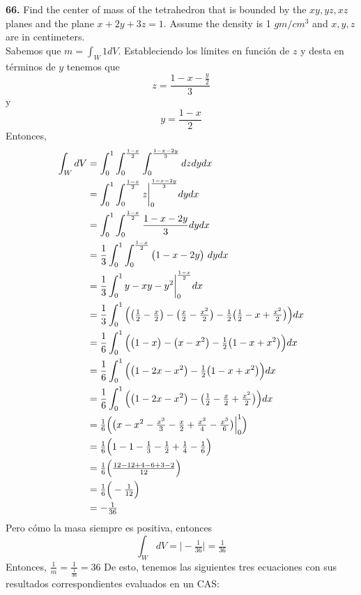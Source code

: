 \documentclass[11pt]{report}
\begin{document}
\textbf{66.} Find the center of mass of the tetrahedron that is bounded by the
$xy, yz, xz$ planes and the plane $x + 2y + 3z = 1$. Assume the density is
1 $gm/cm^3$ and $x, y, z$ are in centimeters. \\
Sabemos que $m = \int_W 1dV$. Estableciendo los límites en función de $z$ y desta en
términos de $y$
tenemos que
$$z=\frac{1-x-\tfrac{y}{2}}{3}$$ y
$$y=\frac{1-x}{2}$$
Entonces,
	\begin{align*}
		\int_WdV&=\int_0^1\tsint{\frac{1-x}{2}}\tsint{\frac{1-x-2y}{3}}dzdydx\\
			    &=\int_0^1\tsint{\frac{1-x}{2}}z\bigg|_0^{\frac{1-x-2y}{3}}dydx\\
				&=\int_0^1\tsint{\frac{1-x}{2}}\frac{1-x-2y}{3}dydx\\
				&=\frac{1}{3}\int_0^1\tsint{\frac{1-x}{2}}\bp{1-x-2y}\ dydx\\
				&=\frac{1}{3}\int_0^1y-xy-y^2\bigg|_0^{\frac{1-x}{2}}dx\\
				&=\frac{1}{3}\int_0^1\Bp{\bp{\tfrac{1}{2}-\tfrac{x}{2}}-\bp{\tfrac{x}{2}
					-\tfrac{x^2}{2}}-\tfrac{1}{2}\bp{\tfrac{1}{2}-x+\tfrac{x^2}{2}}}dx\\
				&=\frac{1}{6}\int_0^1\Bp{\bp{1-x}-\bp{x-x^2}-\tfrac{1}{2}\bp{1-x+x^2}}dx\\
				&=\frac{1}{6}\int_0^1\Bp{\bp{1-2x-x^2}-\tfrac{1}{2}\bp{1-x+x^2}}dx\\
				&=\frac{1}{6}\int_0^1\Bp{\bp{1-2x-x^2}-\bp{\tfrac{1}{2}-\tfrac{x}{2}+\tfrac{x^2}{2}}}dx\\
				&=\tfrac{1}{6}\Bp{\bp{x-x^2-\tfrac{x^3}{3}-\tfrac{x}{2}+\tfrac{x^2}{4}
					-\tfrac{x^3}{6}}\Big|_0^1}\\
				&=\tfrac{1}{6}\Bp{1-1-\tfrac{1}{3}-\tfrac{1}{2}+\tfrac{1}{4}-\tfrac{1}{6}}\\
				&=\tfrac{1}{6}\Bp{\tfrac{12-12+4-6+3-2}{12}}\\
				&=\tfrac{1}{6}\Bp{-\tfrac{1}{12}}\\
				&=-\tfrac{1}{36}\\
	\end{align*}
Pero cómo la masa siempre es positiva, entonces
\[\int_WdV=\Big|-\tfrac{1}{36}\Big|=\tfrac{1}{36}\]
Entonces, $\frac{1}{m}=\frac{1}{\frac{1}{36}}=36$
De esto, tenemos las siguientes tres ecuaciones con sus resultados correspondientes
evaluados en un CAS:
\end{document}
